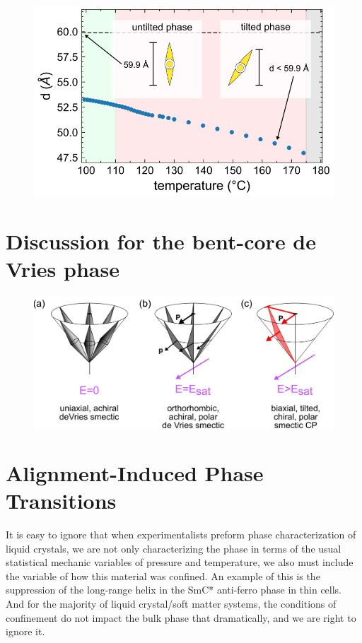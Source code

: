 \documentclass[aagreenthesis]{subfiles}
\begin{document}
\begin{figure}[h!]
    \centering
    \includegraphics{figs/pal30/xraysm1/sm1-saxs-annote.png}
    \caption{\label{}}
\end{figure}




\section{Discussion for the bent-core de Vries phase}
\begin{figure}[h!]
    \centering
    \includegraphics{figs/pal30/deVries/dvAlign.png}
    \caption{\label{}}
\end{figure}

\section{Alignment-Induced Phase Transitions}
It is easy to ignore that when experimentalists preform phase characterization
of liquid crystals, we are not only characterizing the phase in terms of the
usual statistical mechanic variables of pressure and temperature, we also must
include the variable of how this material was confined. An example of this is
the suppression of the long-range helix in the SmC* anti-ferro phase in thin cells. And for the majority of liquid crystal/soft
matter systems, the conditions of confinement do not impact the bulk phase that
dramatically, and we are right to ignore it.
\end{document}
